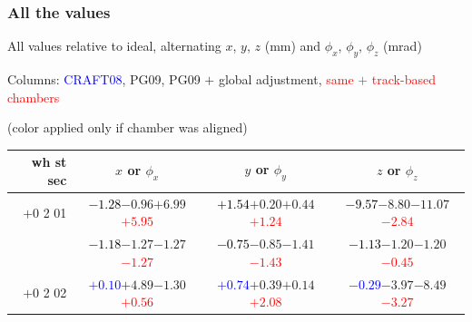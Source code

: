\documentclass[compress]{beamer}
\begin{document}
\begin{frame}
\frametitle{All the values}
\tiny

All values relative to ideal, alternating $x$, $y$, $z$ (mm) and $\phi_x$, $\phi_y$, $\phi_z$ (mrad)

Columns: \textcolor{blue}{CRAFT08}, PG09, PG09 $+$ global adjustment, \textcolor{red}{same $+$ track-based chambers}

\hfill (color applied only if chamber was aligned)

\vfill
\renewcommand{\arraystretch}{1.1}
\begin{tabular}{r | c | c | c}
wh st sec & $x$ or $\phi_x$ & $y$ or $\phi_y$ & $z$ or $\phi_z$ \\\hline
$+$0 2 01 & \textcolor{black}{$-1.28$}\hspace{0.1 cm}$-0.96$\hspace{0.1 cm}$+6.99$\hspace{0.1 cm}\textcolor{red}{$+5.95$} & \textcolor{black}{$+1.54$}\hspace{0.1 cm}$+0.20$\hspace{0.1 cm}$+0.44$\hspace{0.1 cm}\textcolor{red}{$+1.24$} & \textcolor{black}{$-9.57$}\hspace{0.1 cm}$-8.80$\hspace{0.1 cm}$-11.07$\hspace{0.1 cm}\textcolor{red}{$-2.84$} \\
          & \textcolor{black}{$-1.18$}\hspace{0.1 cm}$-1.27$\hspace{0.1 cm}$-1.27$\hspace{0.1 cm}\textcolor{red}{$-1.27$} & \textcolor{black}{$-0.75$}\hspace{0.1 cm}$-0.85$\hspace{0.1 cm}$-1.41$\hspace{0.1 cm}\textcolor{red}{$-1.43$} & \textcolor{black}{$-1.13$}\hspace{0.1 cm}$-1.20$\hspace{0.1 cm}$-1.20$\hspace{0.1 cm}\textcolor{red}{$-0.45$} \\
$+$0 2 02 & \textcolor{blue}{$+0.10$}\hspace{0.1 cm}$+4.89$\hspace{0.1 cm}$-1.30$\hspace{0.1 cm}\textcolor{red}{$+0.56$} & \textcolor{blue}{$+0.74$}\hspace{0.1 cm}$+0.39$\hspace{0.1 cm}$+0.14$\hspace{0.1 cm}\textcolor{red}{$+2.08$} & \textcolor{blue}{$-0.29$}\hspace{0.1 cm}$-3.97$\hspace{0.1 cm}$-8.49$\hspace{0.1 cm}\textcolor{red}{$-3.27$} \\

\end{tabular}
\end{frame}
\end{document}
